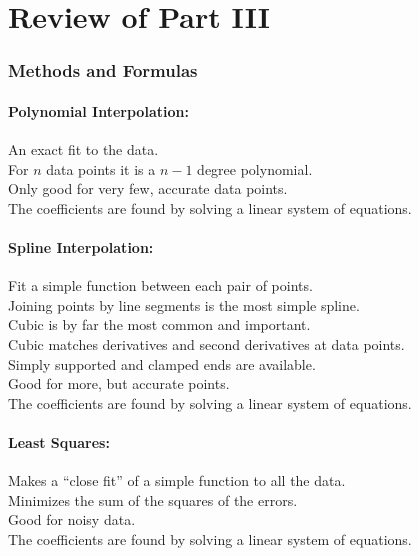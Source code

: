 
\chapter*{Review of Part III}

\subsection*{Methods and Formulas}


\subsubsection*{Polynomial Interpolation:}
An exact fit to the data.\\
For $n$ data points it is a $n-1$ degree polynomial.\\
Only good for very few, accurate data points.\\
The coefficients are found by solving a linear system of equations.

\subsubsection*{Spline Interpolation:}
Fit a simple function between each pair of points.\\
Joining points by line segments is the most simple spline.\\
Cubic is by far the most common and important.\\
Cubic matches derivatives and second derivatives at data points.\\
Simply supported and clamped ends are available.\\
Good for more, but accurate points.\\
The coefficients are found by solving a linear system of equations.

\subsubsection*{Least Squares:}
Makes a ``close fit'' of a simple function to all the data.\\
Minimizes the sum of the squares of the errors.\\
Good for noisy data.\\
The coefficients are found by solving a linear system of equations.


